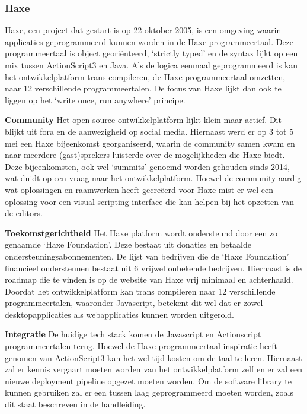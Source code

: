 \subsubsection{Haxe}
Haxe, een project dat gestart is op 22 oktober 2005, is een omgeving waarin applicaties geprogrammeerd kunnen worden in de Haxe programmeertaal. Deze programmeertaal is object georiënteerd, ‘strictly typed’ en de syntax lijkt op een mix tussen ActionScript3 en Java. Als de logica eenmaal geprogrammeerd is kan het ontwikkelplatform trans compileren, de Haxe programmeertaal omzetten, naar 12 verschillende programmeertalen\cite{CompilerTargetsHaxe}. De focus van Haxe lijkt dan ook te liggen op het ‘write once, run anywhere’ principe.

\textbf{Community}
Het open-source ontwikkelplatform lijkt klein maar actief. Dit blijkt uit fora en de aanwezigheid op social media\cite{HaxeCommunitySupport}. Hiernaast werd er op 3 tot 5 mei een Haxe bijeenkomst georganiseerd, waarin de community samen kwam en naar meerdere (gast)sprekers luisterde over de mogelijkheden die Haxe biedt\cite{HaxeSummit}. Deze bijeenkomsten, ook wel ‘summits’ genoemd worden gehouden sinds 2014\cite{HaxeSummitSince2014}, wat duidt op een vraag naar het ontwikkelplatform.
Hoewel de community aardig wat oplossingen en raamwerken heeft gecreëerd voor Haxe\cite{HaxeGithubTrending} mist er wel een oplossing voor een visual scripting interface die kan helpen bij het opzetten van de editors.

\textbf{Toekomstgerichtheid}
Het Haxe platform wordt ondersteund door een zo genaamde ‘Haxe Foundation’. Deze bestaat uit donaties en betaalde ondersteuningsabonnementen. De lijst van bedrijven die de ‘Haxe Foundation’ financieel ondersteunen bestaat uit 6 vrijwel onbekende bedrijven. Hiernaast is de roadmap die te vinden is op de website van Haxe vrij minimaal en achterhaald.
Doordat het ontwikkelplatform kan trans compileren naar 12 verschillende programmeertalen, waaronder Javascript, betekent dit wel dat er zowel desktopapplicaties als webapplicaties kunnen worden uitgerold.

\textbf{Integratie}
De huidige tech stack komen de Javascript en Actionscript programmeertalen terug. Hoewel de Haxe programmeertaal inspiratie heeft genomen van ActionScript3 kan het wel tijd kosten om de taal te leren. Hiernaast zal er kennis vergaart moeten worden van het ontwikkelplatform zelf en er zal een nieuwe deployment pipeline opgezet moeten worden.
Om de software library te kunnen gebruiken zal er een tussen laag geprogrammeerd moeten worden, zoals dit staat beschreven in de handleiding\cite{HaxeUsingExternalJavaScriptLibraries}.

